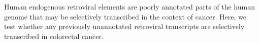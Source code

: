 Human endogenous retroviral elements are poorly annotated parts of the human genome that may be selectively transcribed in the context of cancer.
Here, we test whether any previously unannotated retroviral transcripts are selectively transcribed in colorectal cancer.
